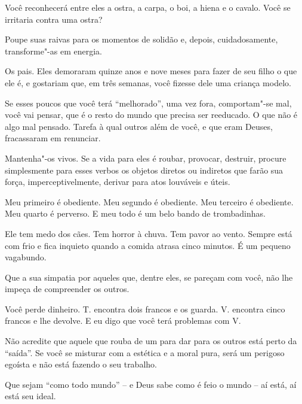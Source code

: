 Você reconhecerá entre eles a ostra, a carpa, o boi, a hiena e o cavalo.
Você se irritaria contra uma ostra?

\bigskip
\bigskip

Poupe suas raivas para os momentos de solidão e, depois, cuidadosamente,
transforme"-as em energia.

\bigskip
\bigskip

Os pais. Eles demoraram quinze anos e nove meses para fazer de seu filho
o que ele é, e gostariam que, em três semanas, você fizesse dele uma
criança modelo.

\bigskip
\bigskip

Se esses poucos que você terá ``melhorado'', uma vez fora, comportam"-se
mal, você vai pensar, que é o resto do mundo que precisa ser reeducado.
O que não é algo mal pensado. Tarefa à qual outros além de você, e que
eram Deuses, fracassaram em renunciar.

\bigskip
\bigskip

Mantenha"-os vivos. Se a vida para eles é roubar, provocar, destruir,
procure simplesmente para esses verbos os objetos diretos ou indiretos
que farão sua força, imperceptivelmente, derivar para atos louváveis e
úteis.

\bigskip
\bigskip

Meu primeiro é obediente. Meu segundo é obediente. Meu terceiro é
obediente. Meu quarto é perverso. E meu todo é um belo bando de
trombadinhas.

\bigskip
\bigskip

Ele tem medo dos cães. Tem horror à chuva. Tem pavor ao vento. Sempre
está com frio e fica inquieto quando a comida atrasa cinco minutos. É um
pequeno vagabundo.

\bigskip
\bigskip

Que a sua simpatia por aqueles que, dentre eles, se pareçam com você,
não lhe impeça de compreender os outros.

\bigskip
\bigskip

Você perde dinheiro. T. encontra dois francos e os guarda. V. encontra
cinco francos e lhe devolve. E eu digo que você terá problemas com V.

\bigskip
\bigskip

Não acredite que aquele que rouba de um para dar para os outros está
perto da ``saída''. Se você se misturar com a estética e a moral pura,
será um perigoso egoísta e não está fazendo o seu trabalho.

\bigskip
\bigskip

Que sejam ``como todo mundo'' -- e Deus sabe como é feio o mundo -- aí
está, aí está seu ideal.

